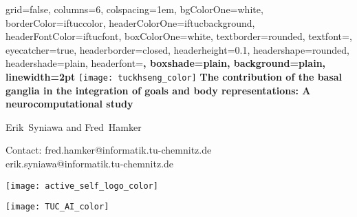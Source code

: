 \documentclass[portrait,final,a0paper,fontscale=0.33]{baposter}
\begin{document}
\begin{poster}%
	{
		grid=false,
		columns=6,
		colspacing=1em,
		bgColorOne=white,
		borderColor=iftuccolor,
		headerColorOne=iftucbackground,
		headerFontColor=iftucfont,
		boxColorOne=white,
		textborder=rounded,
		textfont=\small,
		eyecatcher=true,
		headerborder=closed,
		headerheight=0.1\textheight,
		headershape=rounded,
		headershade=plain,
		headerfont=\Large\bf, %
		boxshade=plain,
		background=plain,
		linewidth=2pt
	}
	{\texttt{[image: tuckhseng\_color]}} 
	{\bf\LARGE{The contribution of the basal ganglia in the integration of goals and  body representations: A neurocomputational study}\vspace{10pt}}
	{\large Erik~Syniawa and Fred~Hamker \\ \vspace{0.5em}
	
	\small \centering Contact: fred.hamker@informatik.tu-chemnitz.de \\ erik.syniawa@informatik.tu-chemnitz.de
	}
	{	
		\begin{minipage}[r]{0.1\textwidth}
			\texttt{[image: active\_self\_logo\_color]}
		\end{minipage}
		\hfill
		\begin{minipage}[r]{0.1\textwidth}
			\texttt{[image: TUC\_AI\_color]}
		\end{minipage}
		
	}

\end{poster}
\end{document}
